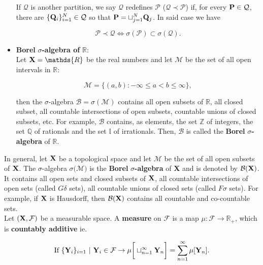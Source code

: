 \documentclass{homework}
\begin{document}
\begin{itemize}
    If $\mathcal{Q}$ is another partition, we say $\mathcal{Q}$ redefines $\mathcal{P}$ ($\mathcal{Q}\prec \mathcal{P}$) if, for every ${\bf P}\in \mathcal{Q}$, there are $\{{\bf Q}_i\}_{i=1}^{N} \in \mathcal{Q}$ so that ${\bf P} = \sqcup_{j=1}^{N} {\bf Q}_{j}$. In said case we have 
    
    $$
    \mathcal{P}\prec \mathcal{Q} \Leftrightarrow \sigma(\mathcal{P}) \subset \sigma(\mathcal{Q}).
    $$ 
    
    \item \textbf{Borel } $\sigma$\textbf{-algebra of } $\mathds{R}$: \\
    
    Let ${\bf X} =\mathds{R}$ be the real numbers and let $\mathcal{M}$ be the set of all open intervals in $\mathds{R}$:
    
    $$
    \mathcal{M} = \{(a,b): -\infty \leq a < b \leq \infty\}, 
    $$
    
    then the $\sigma$-algebra $\mathcal{B} = \sigma(\mathcal{M})$ contains all open subsets of $\mathds{R}$, all closed subset, all countable intersections of open subsets, countable unions of closed subsets, etc. For example, $\mathcal{B}$ contains, as elements, the set $\mathds{Z}$ of integers, the set $\mathds{Q}$ of rationals and the set $\mathds{I}$ of irrationals. Then, $\mathcal{B}$ is called the \textbf{Borel} $\sigma$\textbf{-algebra} of $\mathds{R}$. \\
\end{itemize}

In general, let ${\bf X}$ be a topological space and let $\mathcal{M}$ be the set of all open subsets of ${\bf X}$. The $\sigma$-algebra $\sigma(\mathcal{M)}$ is the \textbf{Borel} $\sigma$\textbf{-algebra} of {\bf X} and is denoted by $\mathcal{B}({\bf X})$. It contains all open sets and closed subsets of ${{\bf X}}$, all countable intersections of open sets (called $G\delta$ sets), all countable unions of closed sets (called $F\sigma$ sets). For example, if ${\bf X}$ is Hausdorff, then $\mathcal{B}({\bf X})$ contains all countable and co-countable sets.\\

Let $({\bf X}, \mathcal{F})$ be a measurable space. A \textbf{measure} on $\mathcal{F}$ is a map $\mu: \mathcal{F} \rightarrow \mathds{R}_{+}$, which is \textbf{countably additive} ie. 

$$
\textnormal{If } \{{\bf Y}_i\}_{i=1} \textnormal{ }| \textnormal{ } {\bf Y}_i \in \mathcal{F} \rightarrow \mu\bigg[\sqcup_{n=1}^{\infty}{\bf Y}_n\bigg] = \sum_{n=1}^{\infty} \mu[{\bf Y}_n].
$$
\end{document}

